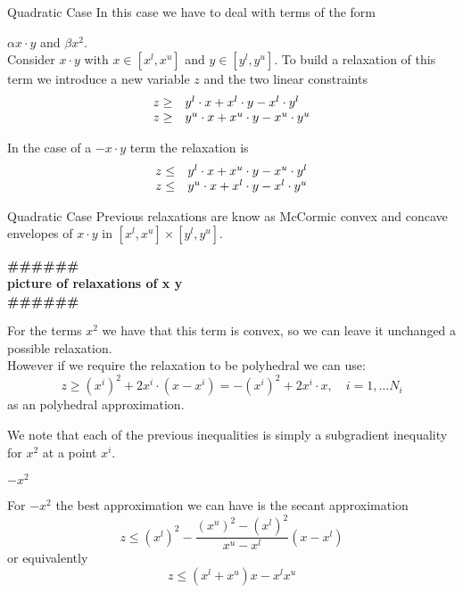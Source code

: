 \documentclass{beamer}
\newcommand{\todo}[1]
{\begin{tiny}
  \begin{center} {\color{red}
  \textbf{ {\#\#\#\hfill\#\#\#}\\{#1}\\\#\#\#\hfill\#\#\#}}
\end{center}
\end{tiny}} %
\begin{document}
\begin{frame}{Quadratic Case}
 In this case we have to deal with terms of the form

 $ \alpha x \cdot y $ and $\beta x^2$. \\
 Consider $x \cdot y$ with $x \in [x^l, x^u]$ and $y \in [y^l, y^u]$.
 To build a relaxation of this term we introduce a new variable $z$ and the two linear
 constraints
 \begin{displaymath}
   \begin{array}[h]{rl}
     z \geq & y^l \cdot x + x^l \cdot y - x^l \cdot y^l \\
     z \geq & y^u \cdot x + x^u \cdot y - x^u \cdot y^u \\
   \end{array}
 \end{displaymath}

 In the case of a $-x \cdot y$ term the relaxation is
 \begin{displaymath}
   \begin{array}[h]{rl}
     z \leq & y^l \cdot x + x^u \cdot y - x^u \cdot y^l \\
     z \leq & y^u \cdot x + x^l \cdot y - x^l \cdot y^u \\
   \end{array}
 \end{displaymath}
\end{frame}

\begin{frame}{Quadratic Case}
  Previous relaxations are know as McCormic convex and concave envelopes of $x \cdot y$
  in $[x^l, x^u] \times [y^l, y^u]$.
  \todo{picture of relaxations of x y}

  For the terms $x^2$ we have that this term is convex, so we can leave it unchanged a
  possible relaxation.\\
  However if we require the relaxation to be polyhedral we can use:
  \begin{displaymath}
    z \geq (x^i)^2 + 2 x^i \cdot (x-x^i) = -(x^i)^2 + 2 x^i \cdot x, \quad i=1,\dots N_i
  \end{displaymath}
  as an polyhedral approximation.

  We note that each of the previous inequalities is simply a subgradient inequality for
  $x^2$ at a point $x^i$.

\end{frame}

\begin{frame}{$-x^2$}

  For $-x^2$ the best approximation we can have is the secant approximation
  \begin{equation}
    z \leq (x^l)^2 - \frac{(x^u)^2 - (x^l)^2}{x^u-x^l} \left( x- x^l \right)
    \label{nx2_1}
  \end{equation}
  or equivalently
  \begin{equation}
    z \leq \left( x^l+x^u \right) x - x^l x^u
    \label{nx2_2}
  \end{equation}

\end{frame}
\end{document}
